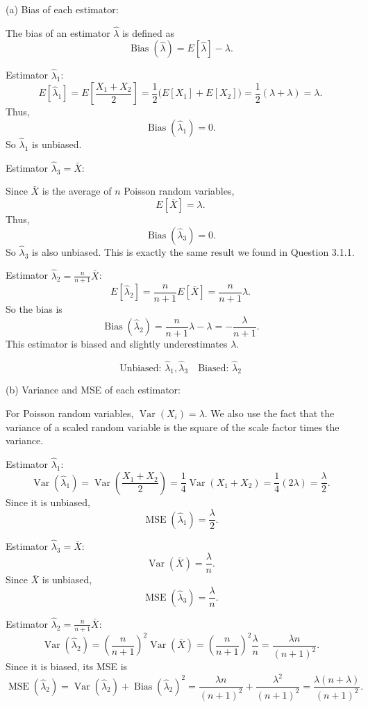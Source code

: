 \documentclass[11pt,letterpaper]{article}
\theoremstyle{remark}
\begin{document}
\medskip
\noindent
(a) Bias of each estimator:

The bias of an estimator $\hat{\lambda}$ is defined as
\[
\operatorname{Bias}(\hat{\lambda}) = E[\hat{\lambda}] - \lambda.
\]

\medskip
\noindent
Estimator $\hat{\lambda}_1$:
\[
E[\hat{\lambda}_1]
= E\!\left[\frac{X_1 + X_2}{2}\right]
= \frac{1}{2}\big(E[X_1] + E[X_2]\big)
= \frac{1}{2}(\lambda + \lambda)
= \lambda.
\]
Thus,
\[
\operatorname{Bias}(\hat{\lambda}_1) = 0.
\]
So $\hat{\lambda}_1$ is unbiased.

\medskip
\noindent
Estimator $\hat{\lambda}_3 = \bar{X}$:

Since $\bar{X}$ is the average of $n$ Poisson random variables,
\[
E[\bar{X}] = \lambda.
\]
Thus,
\[
\operatorname{Bias}(\hat{\lambda}_3) = 0.
\]
So $\hat{\lambda}_3$ is also unbiased. This is exactly the same result we found in Question 3.1.1.

\medskip
\noindent
Estimator $\hat{\lambda}_2 = \frac{n}{n+1}\bar{X}$:
\[
E[\hat{\lambda}_2]
= \frac{n}{n+1}E[\bar{X}]
= \frac{n}{n+1}\lambda.
\]
So the bias is
\[
\operatorname{Bias}(\hat{\lambda}_2)
= \frac{n}{n+1}\lambda - \lambda
= -\frac{\lambda}{n+1}.
\]
This estimator is biased and slightly underestimates $\lambda$.

\[
\boxed{\text{Unbiased: } \hat{\lambda}_1, \hat{\lambda}_3 \quad \text{Biased: } \hat{\lambda}_2}
\]

\medskip
\noindent
(b) Variance and MSE of each estimator:

For Poisson random variables, $\operatorname{Var}(X_i) = \lambda$. We also use the fact that the variance of a scaled random variable is the square of the scale factor times the variance.

\medskip
\noindent
Estimator $\hat{\lambda}_1$:
\[
\operatorname{Var}(\hat{\lambda}_1)
= \operatorname{Var}\!\left(\frac{X_1 + X_2}{2}\right)
= \frac{1}{4}\operatorname{Var}(X_1 + X_2)
= \frac{1}{4}(2\lambda)
= \frac{\lambda}{2}.
\]
Since it is unbiased,
\[
\operatorname{MSE}(\hat{\lambda}_1) = \frac{\lambda}{2}.
\]

\medskip
\noindent
Estimator $\hat{\lambda}_3 = \bar{X}$:
\[
\operatorname{Var}(\bar{X})
= \frac{\lambda}{n}.
\]
Since $\bar{X}$ is unbiased,
\[
\operatorname{MSE}(\hat{\lambda}_3) = \frac{\lambda}{n}.
\]

\medskip
\noindent
Estimator $\hat{\lambda}_2 = \frac{n}{n+1}\bar{X}$:
\[
\operatorname{Var}(\hat{\lambda}_2)
= \left(\frac{n}{n+1}\right)^2\operatorname{Var}(\bar{X})
= \left(\frac{n}{n+1}\right)^2\frac{\lambda}{n}
= \frac{\lambda n}{(n+1)^2}.
\]
Since it is biased, its MSE is
\[
\operatorname{MSE}(\hat{\lambda}_2)
= \operatorname{Var}(\hat{\lambda}_2) + \operatorname{Bias}(\hat{\lambda}_2)^2
= \frac{\lambda n}{(n+1)^2}
  + \frac{\lambda^2}{(n+1)^2}
= \frac{\lambda(n + \lambda)}{(n+1)^2}.
\]
\end{document}
